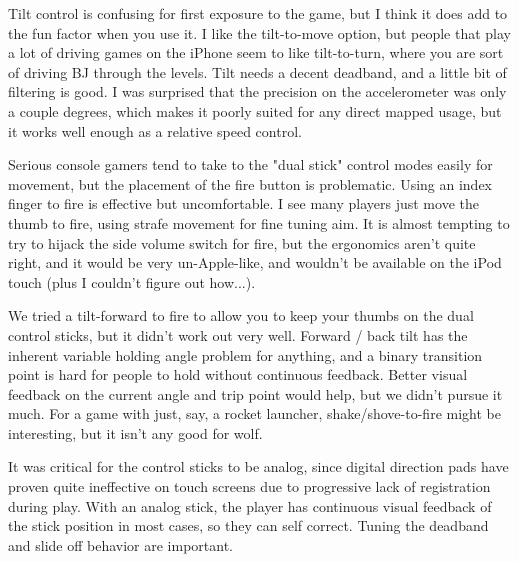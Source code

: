 Tilt control is confusing for first exposure to the game, but I think it does add to the fun factor when you use it.  I like the tilt-to-move option, but people that play a lot of driving games on the iPhone seem to like tilt-to-turn, where you are sort of driving BJ through the levels.  Tilt needs a decent deadband, and a little bit of filtering is good.  I was surprised that the precision on the accelerometer was only a couple degrees, which makes it poorly suited for any direct mapped usage, but it works well enough as a relative speed control.\\
\par

Serious console gamers tend to take to the "dual stick" control modes easily for movement, but the placement of the fire button is problematic.  Using an index finger to fire is effective but uncomfortable.  I see many players just move the thumb to fire, using strafe movement for fine tuning aim.  It is almost tempting to try to hijack the side volume switch for fire, but the ergonomics aren't quite right, and it would be very un-Apple-like, and wouldn't be available on the iPod touch (plus I couldn't figure out how...).\\
\par

We tried a tilt-forward to fire to allow you to keep your thumbs on the dual control sticks, but it didn't work out very well.  Forward / back tilt has the inherent variable holding angle problem for anything, and a binary transition point is hard for people to hold without continuous feedback.  Better visual feedback on the current angle and trip point would help, but we didn't pursue it much.  For a game with just, say, a rocket launcher, shake/shove-to-fire might be interesting, but it isn't any good for wolf.\\
\par

It was critical for the control sticks to be analog, since digital direction pads have proven quite ineffective on touch screens due to progressive lack of registration during play.  With an analog stick, the player has continuous visual feedback of the stick position in most cases, so they can self correct.  Tuning the deadband and slide off behavior are important.\\
\par

